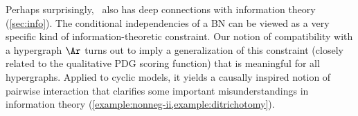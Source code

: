 Perhaps
surprisingly,
\cibility\ 
also has deep connections with information theory
(\cref{sec:info}).
%
The
conditional independencies of a BN can be viewed as a very specific kind of information-theoretic constraint.
Our notion of compatibility with a hypergraph $\Ar$ 
    turns out to imply a generalization of this
    constraint (closely related to the qualitative PDG scoring function)
    that is meaningful for all hypergraphs.
Applied to cyclic models, it yields a causally inspired notion of pairwise interaction that clarifies some important misunderstandings in information theory (\cref{example:nonneg-ii,example:ditrichotomy}).
